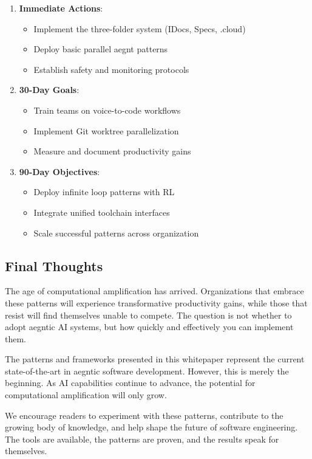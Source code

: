 \documentclass[11pt]{article}
\begin{document}
\begin{enumerate}
\item \textbf{Immediate Actions}:
\begin{itemize}[noitemsep]
\item Implement the three-folder system (IDocs, Specs, .cloud)
\item Deploy basic parallel aegnt patterns
\item Establish safety and monitoring protocols
\end{itemize}

\item \textbf{30-Day Goals}:
\begin{itemize}[noitemsep]
\item Train teams on voice-to-code workflows
\item Implement Git worktree parallelization
\item Measure and document productivity gains
\end{itemize}

\item \textbf{90-Day Objectives}:
\begin{itemize}[noitemsep]
\item Deploy infinite loop patterns with RL
\item Integrate unified toolchain interfaces
\item Scale successful patterns across organization
\end{itemize}
\end{enumerate}

\subsection{Final Thoughts}

The age of computational amplification has arrived. Organizations that embrace these patterns will experience transformative productivity gains, while those that resist will find themselves unable to compete. The question is not whether to adopt aegntic AI systems, but how quickly and effectively you can implement them.

The patterns and frameworks presented in this whitepaper represent the current state-of-the-art in aegntic software development. However, this is merely the beginning. As AI capabilities continue to advance, the potential for computational amplification will only grow.

We encourage readers to experiment with these patterns, contribute to the growing body of knowledge, and help shape the future of software engineering. The tools are available, the patterns are proven, and the results speak for themselves.
\end{document}
